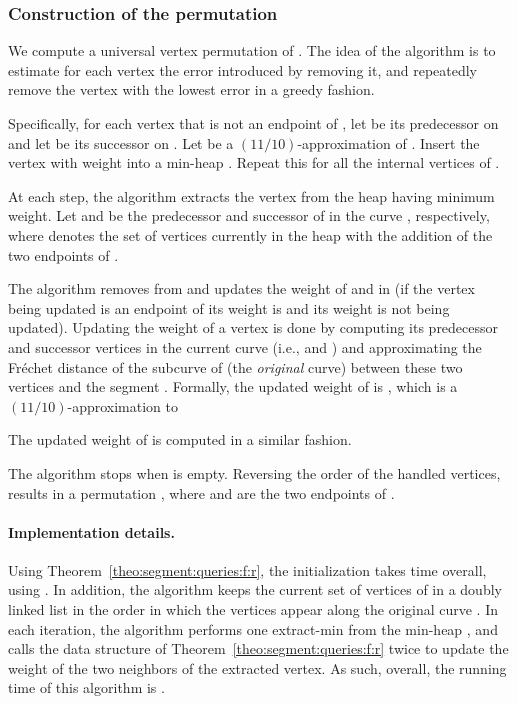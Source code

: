 \documentclass[12pt]{article}
\newcommand{\thmref}[1]{Theorem~\ref{theo:#1}}
\newcommand{\Frechet}{Fr\'{e}c{h}e{}t\xspace}\providecommand{\Arr}{\mathop{\mathrm{\EuScript{A}}}}
\newcommand{\constN}{\ensuremath{({11}/{10})}}
\numberwithin{figure}{section}
\numberwithin{equation}{section}
\newcommand{\postdecessor}{successor\xspace}
\begin{document}
\subsubsection{Construction of the permutation}

We compute a universal vertex permutation of .  The idea of the
algorithm is to estimate for each vertex the error introduced by
removing it, and repeatedly remove the vertex with the lowest error in
a greedy fashion.

Specifically, for each vertex  that is not an endpoint of ,
let  be its predecessor on  and let 
be its \postdecessor on . Let  be a
\constN-approximation of
.  Insert the vertex  with
weight  into a min-heap .  Repeat this for all
the internal vertices of .

At each step, the algorithm extracts the vertex  from the heap
 having minimum weight. Let  and
 be the predecessor and
\postdecessor of  in the curve ,
respectively, where  denotes the set of vertices currently in
the heap with the addition of the two endpoints of .

The algorithm removes  from  and updates the weight of
 and  in  (if the vertex being updated is an
endpoint of  its weight is  and its weight is not being
updated). Updating the weight of a vertex  is done by computing
its predecessor and \postdecessor vertices in the current curve
 (i.e.,  and ) and approximating the \Frechet
distance of the subcurve of (the \emph{original} curve)  between
these two vertices and the segment . Formally, the updated weight of  is
, which is a \constN-approximation to

The updated weight of  is computed in a similar fashion.

The algorithm stops when  is empty. Reversing the order of the
handled vertices, results in a permutation
, where  and  are the
two endpoints of .








\paragraph{Implementation details.}

Using \thmref{segment:queries:f:r}, the initialization takes  time overall, using .  In addition, the
algorithm keeps the current set of vertices of  in a doubly
linked list in the order in which the vertices appear along the
original curve . In each iteration, the algorithm performs one
extract-min from the min-heap , and calls the data structure of
\thmref{segment:queries:f:r} twice to update the weight of the two
neighbors of the extracted vertex. As such, overall, the running time
of this algorithm is .
\end{document}
